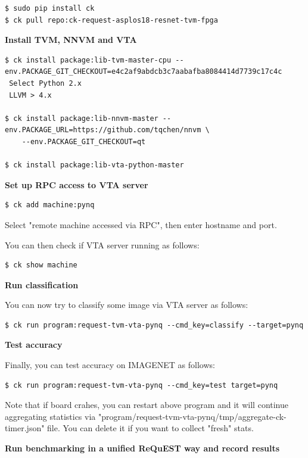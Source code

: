 \documentclass[sigconf]{acmart}
\begin{document}
\begin{verbatim}
$ sudo pip install ck
$ ck pull repo:ck-request-asplos18-resnet-tvm-fpga
\end{verbatim}

\textbf{Install TVM, NNVM and VTA}

\begin{verbatim}
$ ck install package:lib-tvm-master-cpu --env.PACKAGE_GIT_CHECKOUT=e4c2af9abdcb3c7aabafba8084414d7739c17c4c
 Select Python 2.x
 LLVM > 4.x

$ ck install package:lib-nnvm-master --env.PACKAGE_URL=https://github.com/tqchen/nnvm \
    --env.PACKAGE_GIT_CHECKOUT=qt

$ ck install package:lib-vta-python-master
\end{verbatim}

\textbf{Set up RPC access to VTA server}

\begin{verbatim}
$ ck add machine:pynq
\end{verbatim}

Select "remote machine accessed via RPC", then enter hostname and port.

You can then check if VTA server running as follows:

\begin{verbatim}
$ ck show machine
\end{verbatim}

\textbf{Run classification}

You can now try to classify some image via VTA server as follows:

\begin{verbatim}
$ ck run program:request-tvm-vta-pynq --cmd_key=classify --target=pynq
\end{verbatim}

\textbf{Test accuracy}

Finally, you can test accuracy on IMAGENET as follows:

\begin{verbatim}
$ ck run program:request-tvm-vta-pynq --cmd_key=test target=pynq
\end{verbatim}

Note that if board crahes, you can restart above program and it will continue aggregating statistics
via "program/request-tvm-vta-pynq/tmp/aggregate-ck-timer.json" file. 
You can delete it if you want to collect "fresh" stats.

\textbf{Run benchmarking in a unified ReQuEST way and record results}
\end{document}
